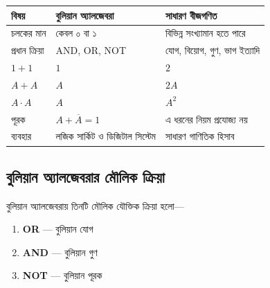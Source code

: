 \begin{center}
\begin{tabularx}{\textwidth}{|L{0.22\textwidth}|Y|Y|}
\hline
{}
\textbf{বিষয়} &
\textbf{বুলিয়ান অ্যালজেবরা} &
\textbf{সাধারণ বীজগণিত} \\
\hline

চলকের মান &
কেবল ০ বা ১ &
বিভিন্ন সংখ্যামান হতে পারে \\
\hline

প্রধান ক্রিয়া &
\textenglish{AND}, \textenglish{OR}, \textenglish{NOT} &
যোগ, বিয়োগ, গুণ, ভাগ ইত্যাদি \\
\hline

\(1+1\) &
\(1\) &
\(2\) \\
\hline

\(A+A\) &
\(A\) &
\(2A\) \\
\hline

\(A\cdot A\) &
\(A\) &
\(A^2\) \\
\hline

পূরক &
\(A+\overline{A}=1\) &
এ ধরনের নিয়ম প্রযোজ্য নয় \\
\hline

ব্যবহার &
লজিক সার্কিট ও ডিজিটাল সিস্টেম &
সাধারণ গাণিতিক হিসাব \\
\hline
\end{tabularx}
\end{center}


\subsection{বুলিয়ান অ্যালজেবরার মৌলিক ক্রিয়া}

বুলিয়ান অ্যালজেবরায় তিনটি মৌলিক যৌক্তিক ক্রিয়া হলো—

\begin{enumerate}[leftmargin=*,itemsep=1pt]
    \item \textbf{\textenglish{OR}} — বুলিয়ান যোগ
    \item \textbf{\textenglish{AND}} — বুলিয়ান গুণ
    \item \textbf{\textenglish{NOT}} — বুলিয়ান পূরক
\end{enumerate}



